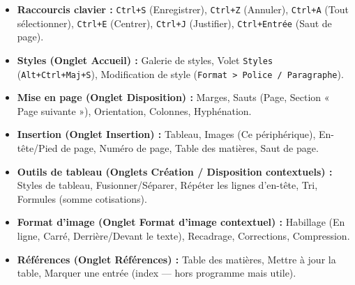\documentclass[11pt]{article}
\begin{document}
\begin{definition}
\begin{itemize}
    \item \textbf{Raccourcis clavier :} \texttt{Ctrl+S} (Enregistrer), \texttt{Ctrl+Z} (Annuler), \texttt{Ctrl+A} (Tout sélectionner), \texttt{Ctrl+E} (Centrer), \texttt{Ctrl+J} (Justifier), \texttt{Ctrl+Entrée} (Saut de page).
    \item \textbf{Styles (Onglet Accueil) :} Galerie de styles, Volet \texttt{Styles} (\texttt{Alt+Ctrl+Maj+S}), Modification de style (\texttt{Format > Police / Paragraphe}).
    \item \textbf{Mise en page (Onglet Disposition) :} Marges, Sauts (Page, Section « Page suivante »), Orientation, Colonnes, Hyphénation.
    \item \textbf{Insertion (Onglet Insertion) :} Tableau, Images (Ce périphérique), En-tête/Pied de page, Numéro de page, Table des matières, Saut de page.
    \item \textbf{Outils de tableau (Onglets Création / Disposition contextuels) :} Styles de tableau, Fusionner/Séparer, Répéter les lignes d'en-tête, Tri, Formules (somme cotisations).
    \item \textbf{Format d'image (Onglet Format d'image contextuel) :} Habillage (En ligne, Carré, Derrière/Devant le texte), Recadrage, Corrections, Compression.
    \item \textbf{Références (Onglet Références) :} Table des matières, Mettre à jour la table, Marquer une entrée (index — hors programme mais utile).
\end{itemize}
\end{definition}
\end{document}
